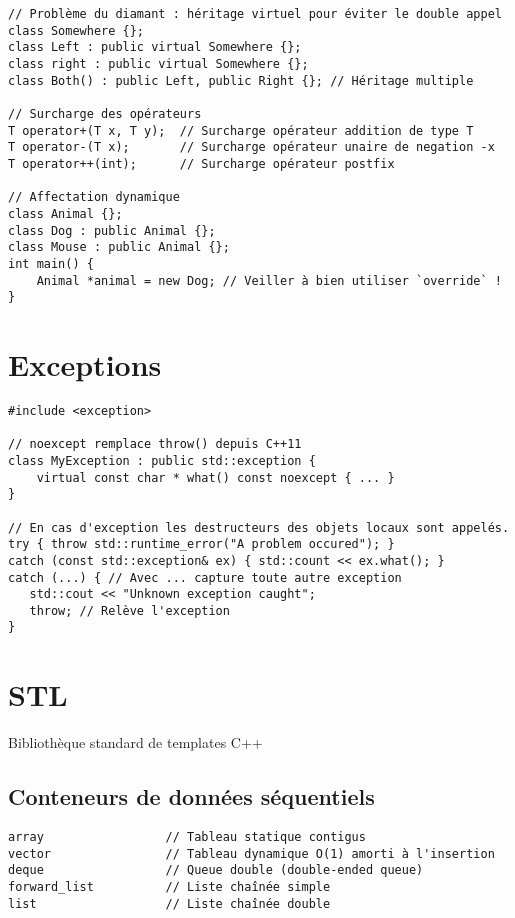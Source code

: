 \documentclass{article}
\begin{document}
\begin{multicols*}{3}
\begin{lstlisting}
// Problème du diamant : héritage virtuel pour éviter le double appel
class Somewhere {};
class Left : public virtual Somewhere {};
class right : public virtual Somewhere {};
class Both() : public Left, public Right {}; // Héritage multiple

// Surcharge des opérateurs
T operator+(T x, T y);  // Surcharge opérateur addition de type T
T operator-(T x);       // Surcharge opérateur unaire de negation -x
T operator++(int);      // Surcharge opérateur postfix

// Affectation dynamique
class Animal {};
class Dog : public Animal {};
class Mouse : public Animal {};
int main() {
    Animal *animal = new Dog; // Veiller à bien utiliser `override` !
}
\end{lstlisting}

\section*{Exceptions}

\begin{lstlisting}
#include <exception>

// noexcept remplace throw() depuis C++11
class MyException : public std::exception {
    virtual const char * what() const noexcept { ... }
}

// En cas d'exception les destructeurs des objets locaux sont appelés.
try { throw std::runtime_error("A problem occured"); }
catch (const std::exception& ex) { std::count << ex.what(); }
catch (...) { // Avec ... capture toute autre exception
   std::cout << "Unknown exception caught";
   throw; // Relève l'exception
}
\end{lstlisting}

\section*{STL}
Bibliothèque standard de templates C++
\subsection*{Conteneurs de données séquentiels}

\begin{lstlisting}
array                 // Tableau statique contigus
vector                // Tableau dynamique O(1) amorti à l'insertion
deque                 // Queue double (double-ended queue)
forward_list          // Liste chaînée simple
list                  // Liste chaînée double


\end{lstlisting}
\end{multicols*}
\end{document}
